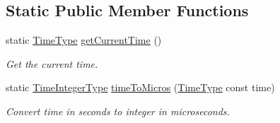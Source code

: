 \subsection*{Static Public Member Functions}
\begin{DoxyCompactItemize}
\item 
static \hyperlink{namespacevt_a2b9f28078dc309ad0706b69ded743e69}{Time\+Type} \hyperlink{structvt_1_1trace_1_1_trace_lite_a5ddfc40d8206946d33630d4b81b6126c}{get\+Current\+Time} ()
\begin{DoxyCompactList}\small\item\em Get the current time. \end{DoxyCompactList}\item 
static \hyperlink{structvt_1_1trace_1_1_trace_lite_a301955b0e2e8d76ca5974c10be8125c4}{Time\+Integer\+Type} \hyperlink{structvt_1_1trace_1_1_trace_lite_a89d749168b5517b592b0603c594e6fdf}{time\+To\+Micros} (\hyperlink{namespacevt_a2b9f28078dc309ad0706b69ded743e69}{Time\+Type} const time)
\begin{DoxyCompactList}\small\item\em Convert time in seconds to integer in microseconds. \end{DoxyCompactList}\end{DoxyCompactItemize}
